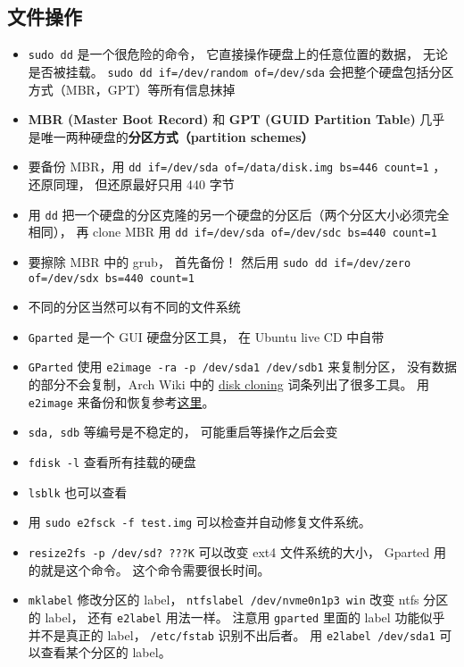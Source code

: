 
\begin{issues}
\issueDraft
\end{issues}

\subsection{文件操作}
\begin{itemize}
\item \verb|sudo dd| 是一个很危险的命令， 它直接操作硬盘上的任意位置的数据， 无论是否被挂载。 \verb|sudo dd if=/dev/random of=/dev/sda| 会把整个硬盘包括分区方式（MBR，GPT）等所有信息抹掉
\item \textbf{MBR (Master Boot Record)} 和 \textbf{GPT (GUID Partition Table)} 几乎是唯一两种硬盘的\textbf{分区方式（partition schemes）}
\item 要备份 MBR，用 \verb|dd if=/dev/sda of=/data/disk.img bs=446 count=1| ， 还原同理， 但还原最好只用 440 字节
\item 用 \verb|dd| 把一个硬盘的分区克隆的另一个硬盘的分区后（两个分区大小必须完全相同）， 再 clone MBR 用 \verb|dd if=/dev/sda of=/dev/sdc bs=440 count=1|
\item 要擦除 MBR 中的 grub， 首先备份！ 然后用 \verb|sudo dd if=/dev/zero of=/dev/sdx bs=440 count=1|
\item 不同的分区当然可以有不同的文件系统
\item \verb|Gparted| 是一个 GUI 硬盘分区工具， 在 Ubuntu live CD 中自带
\item \verb|GParted| 使用 \verb|e2image -ra -p /dev/sda1 /dev/sdb1| 来复制分区， 没有数据的部分不会复制，Arch Wiki 中的 \href{https://wiki.archlinux.org/title/disk_cloning}{disk cloning} 词条列出了很多工具。 用 \verb|e2image| 来备份和恢复参考\href{https://stackoverflow.com/questions/51755887/backup-and-restore-e2image-how-do-i-properly-pipe-the-output-from-lzop}{这里}。
\item \verb|sda, sdb| 等编号是不稳定的， 可能重启等操作之后会变
\item \verb|fdisk -l| 查看所有挂载的硬盘
\item \verb|lsblk| 也可以查看
\item 用 \verb|sudo e2fsck -f test.img| 可以检查并自动修复文件系统。
\item \verb|resize2fs -p /dev/sd? ???K| 可以改变 ext4 文件系统的大小， Gparted 用的就是这个命令。 这个命令需要很长时间。
\item \verb|mklabel| 修改分区的 label， \verb|ntfslabel /dev/nvme0n1p3 win| 改变 ntfs 分区的 label， 还有 \verb|e2label| 用法一样。 注意用 \verb|gparted| 里面的 label 功能似乎并不是真正的 label， \verb|/etc/fstab| 识别不出后者。 用 \verb|e2label /dev/sda1| 可以查看某个分区的 label。

\end{itemize}
